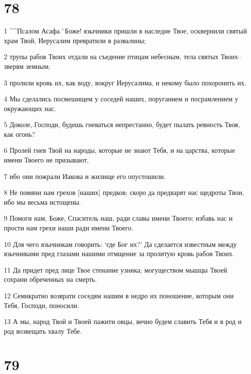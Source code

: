 \chapter{78}

\par 1 ^^Псалом Асафа.^^ Боже! язычники пришли в наследие Твое, осквернили святый храм Твой, Иерусалим превратили в развалины;
\par 2 трупы рабов Твоих отдали на съедение птицам небесным, тела святых Твоих--зверям земным;
\par 3 пролили кровь их, как воду, вокруг Иерусалима, и некому было похоронить их.
\par 4 Мы сделались посмешищем у соседей наших, поруганием и посрамлением у окружающих нас.
\par 5 Доколе, Господи, будешь гневаться непрестанно, будет пылать ревность Твоя, как огонь?
\par 6 Пролей гнев Твой на народы, которые не знают Тебя, и на царства, которые имени Твоего не призывают,
\par 7 ибо они пожрали Иакова и жилище его опустошили.
\par 8 Не помяни нам грехов [наших] предков; скоро да предварят нас щедроты Твои, ибо мы весьма истощены.
\par 9 Помоги нам, Боже, Спаситель наш, ради славы имени Твоего; избавь нас и прости нам грехи наши ради имени Твоего.
\par 10 Для чего язычникам говорить: `где Бог их?' Да сделается известным между язычниками пред глазами нашими отмщение за пролитую кровь рабов Твоих.
\par 11 Да придет пред лице Твое стенание узника; могуществом мышцы Твоей сохрани обреченных на смерть.
\par 12 Семикратно возврати соседям нашим в недро их поношение, которым они Тебя, Господи, поносили.
\par 13 А мы, народ Твой и Твоей пажити овцы, вечно будем славить Тебя и в род и род возвещать хвалу Тебе.

\chapter{79}

